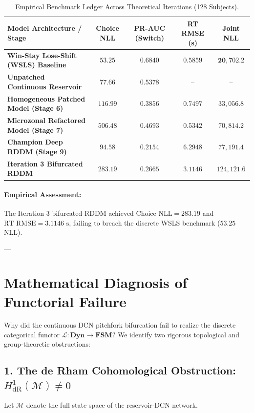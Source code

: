 \documentclass[11pt,a4paper]{article}
\begin{document}
\begin{table}[H]
\centering
\caption{Empirical Benchmark Ledger Across Theoretical Iterations (128 Subjects).}
\label{tab:iteration3_ledger}
\vspace{0.5em}
\small
\begin{tabular}{l c c c c}
\toprule
\textbf{Model Architecture / Stage} & \textbf{Choice NLL} & \textbf{PR-AUC (Switch)} & \textbf{RT RMSE (s)} & \textbf{Joint NLL} \\
\midrule
\textbf{Win-Stay Lose-Shift (WSLS) Baseline} & $\mathbf{53.25}$ & $\mathbf{0.6840}$ & $\mathbf{0.5859}$ & $\mathbf{20,702.2}$ \\
\textbf{Unpatched Continuous Reservoir} & $77.66$ & $0.5378$ & -- & -- \\
\textbf{Homogeneous Patched Model (Stage 6)} & $116.99$ & $0.3856$ & $0.7497$ & $33,056.8$ \\
\textbf{Microzonal Refactored Model (Stage 7)} & $506.48$ & $0.4693$ & $\mathbf{0.5342}$ & $70,814.2$ \\
\textbf{Champion Deep RDDM (Stage 9)} & $94.58$ & $0.2154$ & $6.2948$ & $77,191.4$ \\
\textbf{Iteration 3 Bifurcated RDDM} & $283.19$ & $0.2665$ & $3.1146$ & $124,121.6$ \\
\bottomrule
\end{tabular}
\end{table}

\paragraph{Empirical Assessment:} The Iteration 3 bifurcated RDDM achieved $\text{Choice NLL} = 283.19$ and $\text{RT RMSE} = 3.1146\text{ s}$, failing to breach the discrete WSLS benchmark ($53.25$ NLL).

---

\section{Mathematical Diagnosis of Functorial Failure}

Why did the continuous DCN pitchfork bifurcation fail to realize the discrete categorical functor $\mathcal{L}: \mathbf{Dyn} \to \mathbf{FSM}$? We identify two rigorous topological and group-theoretic obstructions:

\subsection{1. The de Rham Cohomological Obstruction: $H^1_{\text{dR}}(\mathcal{M}) \neq 0$}
Let $\mathcal{M}$ denote the full state space of the reservoir-DCN network.
\end{document}

